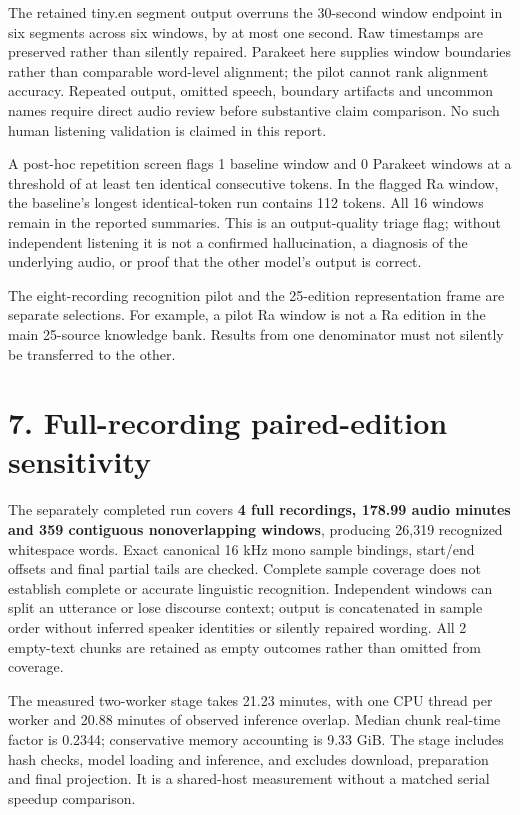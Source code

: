 \documentclass[
  10pt,
]{article}
\begin{document}
The retained tiny.en segment output overruns the 30-second window
endpoint in six segments across six windows, by at most one second. Raw
timestamps are preserved rather than silently repaired. Parakeet here
supplies window boundaries rather than comparable word-level alignment;
the pilot cannot rank alignment accuracy. Repeated output, omitted
speech, boundary artifacts and uncommon names require direct audio
review before substantive claim comparison. No such human listening
validation is claimed in this report.

A post-hoc repetition screen flags 1 baseline window and 0 Parakeet
windows at a threshold of at least ten identical consecutive tokens. In
the flagged Ra window, the baseline's longest identical-token run
contains 112 tokens. All 16 windows remain in the reported summaries.
This is an output-quality triage flag; without independent listening it
is not a confirmed hallucination, a diagnosis of the underlying audio,
or proof that the other model's output is correct.

The eight-recording recognition pilot and the 25-edition representation
frame are separate selections. For example, a pilot Ra window is not a
Ra edition in the main 25-source knowledge bank. Results from one
denominator must not silently be transferred to the other.

\section{7. Full-recording paired-edition
sensitivity}\label{full-recording-paired-edition-sensitivity}

The separately completed run covers \textbf{4 full recordings, 178.99
audio minutes and 359 contiguous nonoverlapping windows}, producing
26,319 recognized whitespace words. Exact canonical 16 kHz mono sample
bindings, start/end offsets and final partial tails are checked.
Complete sample coverage does not establish complete or accurate
linguistic recognition. Independent windows can split an utterance or
lose discourse context; output is concatenated in sample order without
inferred speaker identities or silently repaired wording. All 2
empty-text chunks are retained as empty outcomes rather than omitted
from coverage.

The measured two-worker stage takes 21.23 minutes, with one CPU thread
per worker and 20.88 minutes of observed inference overlap. Median chunk
real-time factor is 0.2344; conservative memory accounting is 9.33 GiB.
The stage includes hash checks, model loading and inference, and
excludes download, preparation and final projection. It is a shared-host
measurement without a matched serial speedup comparison.
\end{document}
